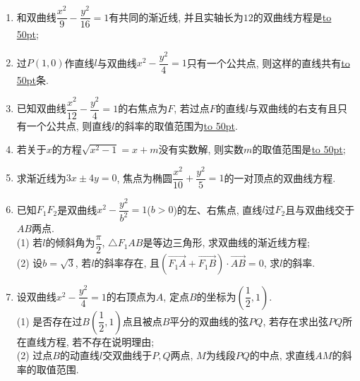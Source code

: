 \documentclass[10pt,a4paper]{article}
\newcommand{\blank}[1]{\underline{\hbox to #1pt{}}}
\begin{document}
\begin{enumerate}[1.]
\item 和双曲线$\dfrac{x^2}9-\dfrac{y^2}{16}=1$有共同的渐近线, 并且实轴长为$12$的双曲线方程是\blank{50};
\item 过$P(1,0)$作直线$l$与双曲线${x^2}-\dfrac{y^2}4=1$只有一个公共点, 则这样的直线共有\blank{50}条.
\item 已知双曲线$\dfrac{x^2}{12}-\dfrac{y^2}4=1$的右焦点为$F$, 若过点$F$的直线$l$与双曲线的右支有且只有一个公共点, 则直线$l$的斜率的取值范围为\blank{50}.
\item 若关于$x$的方程$\sqrt{x^2-1}=x+m$没有实数解, 则实数$m$的取值范围是\blank{50};
\item 求渐近线为$3x\pm 4y=0$, 焦点为椭圆$\dfrac{x^2}{10}+\dfrac{y^2}5=1$的一对顶点的双曲线方程.
\item 已知$F_1F_2$是双曲线${x^2}-\dfrac{y^2}{b^2}=1$($b>0$)的左、右焦点, 直线$l$过$F_2$且与双曲线交于$AB$两点.\\
(1) 若$l$的倾斜角为$\dfrac{\pi}2$, $\triangle F_1AB$是等边三角形, 求双曲线的渐近线方程;\\
(2) 设$b=\sqrt 3$, 若$l$的斜率存在, 且$(\overrightarrow{F_1A}+\overrightarrow{F_1B})\cdot \overrightarrow{AB}=0$, 求$l$的斜率.
\item 设双曲线${x^2}-\dfrac{y^2}4=1$的右顶点为$A$, 定点$B$的坐标为$(\dfrac 12,1)$.\\
(1) 是否存在过$B(\dfrac 12,1)$点且被点$B$平分的双曲线的弦$PQ$, 若存在求出弦$PQ$所在直线方程, 若不存在说明理由;\\
(2) 过点$B$的动直线$l$交双曲线于$P,Q$两点, $M$为线段$PQ$的中点, 求直线$AM$的斜率的取值范围.





\end{enumerate}
\end{document}
